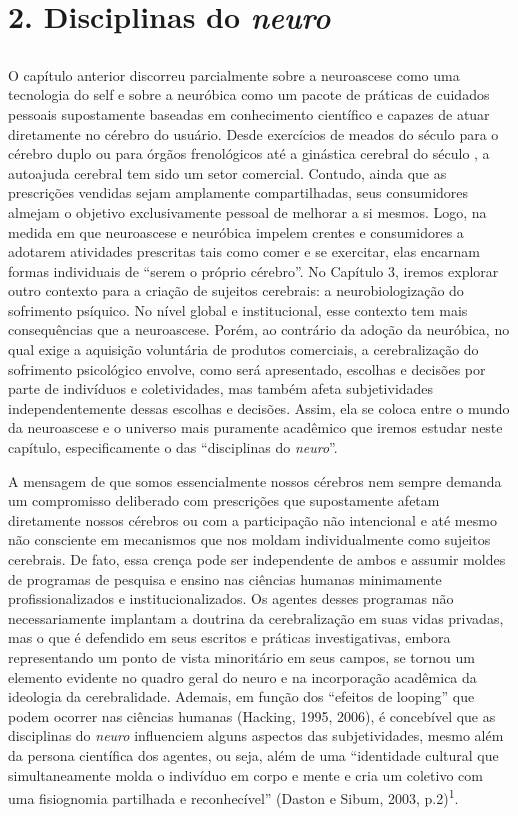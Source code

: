\part{2. Disciplinas do \emph{neuro}}

\chapter*{}

O capítulo anterior discorreu parcialmente sobre a neuroascese como uma
tecnologia do self e sobre a neuróbica como um pacote de práticas de
cuidados pessoais supostamente baseadas em conhecimento científico e
capazes de atuar diretamente no cérebro do usuário. Desde exercícios de
meados do século  para o cérebro duplo ou para órgãos frenológicos
até a ginástica cerebral do século , a autoajuda cerebral tem sido um
setor comercial. Contudo, ainda que as prescrições vendidas sejam
amplamente compartilhadas, seus consumidores almejam o objetivo
exclusivamente pessoal de melhorar a si mesmos. Logo, na medida em que
neuroascese e neuróbica impelem crentes e consumidores a adotarem
atividades prescritas tais como comer e se exercitar, elas encarnam
formas individuais de ``serem o próprio cérebro''. No Capítulo 3, iremos
explorar outro contexto para a criação de sujeitos cerebrais: a
neurobiologização do sofrimento psíquico. No nível global e
institucional, esse contexto tem mais consequências que a neuroascese.
Porém, ao contrário da adoção da neuróbica, no qual exige a aquisição
voluntária de produtos comerciais, a cerebralização do sofrimento
psicológico envolve, como será apresentado, escolhas e decisões por
parte de indivíduos e coletividades, mas também afeta subjetividades
independentemente dessas escolhas e decisões. Assim, ela se coloca entre
o mundo da neuroascese e o universo mais puramente acadêmico que iremos
estudar neste capítulo, especificamente o das ``disciplinas do
\emph{neuro}''.

A mensagem de que somos essencialmente nossos cérebros nem sempre
demanda um compromisso deliberado com prescrições que supostamente
afetam diretamente nossos cérebros ou com a participação não intencional
e até mesmo não consciente em mecanismos que nos moldam individualmente
como sujeitos cerebrais. De fato, essa crença pode ser independente de
ambos e assumir moldes de programas de pesquisa e ensino nas ciências
humanas minimamente profissionalizados e institucionalizados. Os agentes
desses programas não necessariamente implantam a doutrina da
cerebralização em suas vidas privadas, mas o que é defendido em seus
escritos e práticas investigativas, embora representando um ponto de
vista minoritário em seus campos, se tornou um elemento evidente no
quadro geral do neuro e na incorporação acadêmica da ideologia da
cerebralidade. Ademais, em função dos ``efeitos de looping'' que podem
ocorrer nas ciências humanas (Hacking, 1995, 2006), é concebível que as
disciplinas do \emph{neuro} influenciem alguns aspectos das
subjetividades, mesmo além da persona científica dos agentes, ou seja,
além de uma ``identidade cultural que simultaneamente molda o indivíduo
em corpo e mente e cria um coletivo com uma fisiognomia partilhada e
reconhecível'' (Daston e Sibum, 2003, p.2)\textsuperscript{1}.

